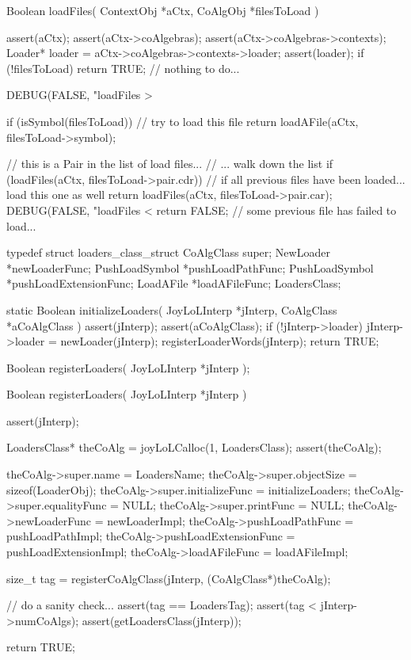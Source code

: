 \starttyping
Boolean loadFiles(
  ContextObj *aCtx,
  CoAlgObj   *filesToLoad
) {
  assert(aCtx);
  assert(aCtx->coAlgebras);
  assert(aCtx->coAlgebras->contexts);
  Loader* loader = aCtx->coAlgebras->contexts->loader;
  assert(loader);
  if (!filesToLoad) return TRUE; // nothing to do...

  DEBUG(FALSE, "loadFiles > %

  if (isSymbol(filesToLoad)) { // try to load this file
    return loadAFile(aCtx, filesToLoad->symbol);
  }

  // this is a Pair in the list of load files...
  // ... walk down the list
  if (loadFiles(aCtx, filesToLoad->pair.cdr)) {
    // if all previous files have been loaded... load this one as well
    return loadFiles(aCtx, filesToLoad->pair.car);
  }
  DEBUG(FALSE, "loadFiles < %
  return FALSE; // some previous file has failed to load...
}
\stoptyping

\startTestSuite[regiserLoaders]

\startCHeader
typedef struct loaders_class_struct {
  CoAlgClass      super;
  NewLoader      *newLoaderFunc;
  PushLoadSymbol *pushLoadPathFunc;
  PushLoadSymbol *pushLoadExtensionFunc;
  LoadAFile      *loadAFileFunc;
} LoadersClass;
\stopCHeader

\startCCode
static Boolean initializeLoaders(
  JoyLoLInterp *jInterp,
  CoAlgClass   *aCoAlgClass
) {
  assert(jInterp);
  assert(aCoAlgClass);
  if (!jInterp->loader) {
    jInterp->loader = newLoader(jInterp);
  }
  registerLoaderWords(jInterp);
  return TRUE;
}
\stopCCode

\startCHeader
Boolean registerLoaders(
  JoyLoLInterp *jInterp
);
\stopCHeader
{}

\startCCode
Boolean registerLoaders(
  JoyLoLInterp *jInterp
) {
  assert(jInterp);
  
  LoadersClass* theCoAlg =
    joyLoLCalloc(1, LoadersClass);
  assert(theCoAlg);
  
  theCoAlg->super.name            = LoadersName;
  theCoAlg->super.objectSize      = sizeof(LoaderObj);
  theCoAlg->super.initializeFunc  = initializeLoaders;
  theCoAlg->super.equalityFunc    = NULL;
  theCoAlg->super.printFunc       = NULL;
  theCoAlg->newLoaderFunc         = newLoaderImpl;
  theCoAlg->pushLoadPathFunc      = pushLoadPathImpl;
  theCoAlg->pushLoadExtensionFunc = pushLoadExtensionImpl;
  theCoAlg->loadAFileFunc         = loadAFileImpl;

  size_t tag =
    registerCoAlgClass(jInterp, (CoAlgClass*)theCoAlg);
  
  // do a sanity check...
  assert(tag == LoadersTag);
  assert(tag < jInterp->numCoAlgs);
  assert(getLoadersClass(jInterp));

  return TRUE;
}
\stopCCode

